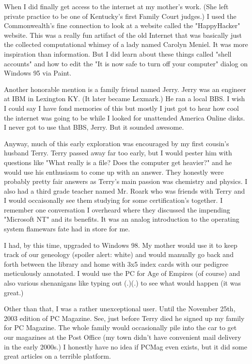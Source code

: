 \documentclass[11pt]{article}
\begin{document}
When I did finally get access to the internet at my mother's work. (She left private practice to be one of Kentucky's first Family Court judges.) I used the Commonwealth's fine connection to look at a website called the "HappyHacker" website. This was a really fun artifact of the old Internet that was basically just the collected computational whimsy of a lady named Carolyn Meniel. It was more inspiration than information. But I did learn about these things called "shell accounts" and how to edit the "It is now safe to turn off your computer" dialog on Windows 95 via Paint. 

Another honorable mention is a family friend named Jerry. Jerry was an engineer at IBM in Lexington KY. (It later became Lexmark.) He ran a local BBS. I wish I could say I have fond memories of this but mostly I just got to hear how cool the internet was going to be while I looked for unattended America Online disks. I never got to use that BBS, Jerry. But it sounded awesome.

Anyway, much of this early exploration was encouraged by my first cousin's husband Terry. Terry passed away far too early, but I would pester him with questions like "What really is a file? Does the computer get heavier?" and he would use his enthusiasm to come up with an answer. They honestly were probably pretty fair answers as Terry's main passion was chemistry and physics. I also had a third grade teacher named Mr. Roark who was friends with Terry and I would occaisonally see them studying for some certification's together. I remember one conversation I overheard where they discussed the impending "Microsoft NT" and its benefits. It was an analog introduction to the operating system flamewars fate had in store for me.

I had, by this time, upgraded to Windows 98. My mother would use it to keep track of our geneology (spoiler alert: white) and would manually go back and forth between the library and home with 3x5 index cards with our pedigree meticulously annotated. I would use the PC for Age of Empires (of course) and also various shenanigans like typing out (.)(.) to see what would happen (it was great.)

Other than that, I was a rather unexceptional user. Until the November 25th, 2003 edition of PC Magazine. See, just before Terry died he signed up my family for PC Magazine. The whole family would occasionally pile into the car to get our magazines at the Post Office (my town didn't have convenient mail delivery in the early 2000s.) I honestly have no idea if PCMag even exists, but it did some great articles on a terrible platform.
\end{document}
